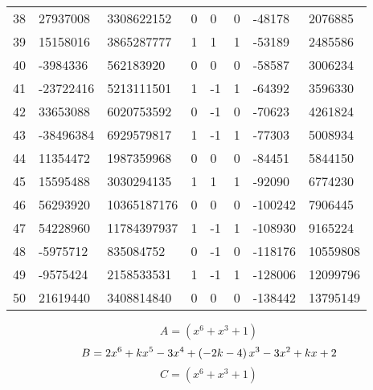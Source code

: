 \documentclass{amsart}
\begin{document}
\begin{longtable}{|l|l|l|lllll|}
38&27937008&3308622152&0&0&0&-48178&2076885\\
39&15158016&3865287777&1&1&1&-53189&2485586\\
40&-3984336&562183920&0&0&0&-58587&3006234\\
41&-23722416&5213111501&1&-1&1&-64392&3596330\\
42&33653088&6020753592&0&-1&0&-70623&4261824\\
43&-38496384&6929579817&1&-1&1&-77303&5008934\\
44&11354472&1987359968&0&0&0&-84451&5844150\\
45&15595488&3030294135&1&1&1&-92090&6774230\\
46&56293920&10365187176&0&0&0&-100242&7906445\\
47&54228960&11784397937&1&-1&1&-108930&9165224\\
48&-5975712&835084752&0&-1&0&-118176&10559808\\
49&-9575424&2158533531&1&-1&1&-128006&12099796\\
50&21619440&3408814840&0&0&0&-138442&13795149\\
\hline
\end{longtable}
$$A=(x^6
 + x^3
 + 1)$$
$$B=2\*x^6
 + k\*x^5
 - 3\*x^4
 + \left(-2\*k
 - 4\right) \*x^3
 - 3\*x^2
 + k\*x
 + 2$$
$$C=(x^6
 + x^3
 + 1)$$
\end{document}
